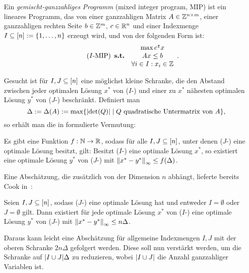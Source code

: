 Ein \emph{gemischt-ganzzahliges Programm} (mixed integer program, MIP) ist ein lineares Programm, das von einer ganzzahligen Matrix $A\in\mathbb{Z}^{n\times m}$, einer ganzzahligen rechten Seite $b\in\mathbb{Z}^m$, $c\in\mathbb{R}^n$ und einer Indexmenge $I\subseteq[n]:=\{1,\dots,n\}$ erzeugt wird, und von der folgenden Form ist:
\begin{equation}\tag{$I$-\MIPI}
\begin{array}{lc}
&\max c\transpose x \\
\subjectTo &Ax\leq b\\
&\forall i\in I: x_i\in\Z
\end{array}.
\end{equation}

Gesucht ist für $I,J\subseteq[n]$ eine möglichst kleine Schranke, die den Abstand zwischen jeder optimalen Lösung $x^*$ von ($I$-\MIPI) und einer zu $x^*$ nähesten optimalen Lösung $y^*$ von ($J$-\MIPI) beschränkt.
Definiert man
$$\Delta:=\Delta(A):=\max\{\lvert  \det(Q) \rvert \mid Q \text{ quadratische Untermatrix von } A \},$$
so erhält man die in \cite{Paat2018} formulierte Vermutung:

\begin{conjecture}\label{con:delta}
	Es gibt eine Funktion $f: \mathbb{N}\rightarrow\mathbb{R}$, sodass für alle $I,J\subseteq[n]$, unter denen ($J$-\MIPI) eine optimale Lösung besitzt, gilt:
	Besitzt ($I$-\MIPI) eine optimale Lösung $x^*$, so existiert eine optimale 
	Lösung $y^*$ von ($J$-\MIPI) mit $\left\lVert x^* - y^*\right\rVert_\infty\leq f(\Delta)$.
\end{conjecture}

Eine Abschätzung, die zusätzlich von der Dimension $n$ abhängt, lieferte bereits Cook in~\cite[Theorem 1 und Bemerkung 1]{Cook1986}:

\begin{theorem}[Cook et al., 1986]\label{thm:cook}
	Seien $I, J\subseteq[n]$, sodass ($J$-\MIPI) eine optimale Lösung hat und entweder $I=\emptyset$ oder $J=\emptyset$ gilt.
	Dann existiert für jede optimale Lösung $x^*$ von ($I$-\MIPI) eine optimale Lösung $y^*$ von ($J$-\MIPI) mit $\left\lVert x^*-y^*\right\rVert_\infty\leq n\Delta$.
\end{theorem}

Daraus kann leicht eine Abschätzung für allgemeine Indexmengen $I,J$ mit der oberen Schranke $2n\Delta$ gefolgert werden.
Diese soll nun verstärkt werden, um die Schranke auf $\lvert I\cup J \rvert\Delta$ zu reduzieren, wobei $\lvert I\cup J \rvert$ die Anzahl ganzzahliger Variablen ist.

